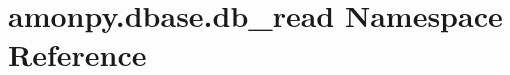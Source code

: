 \hypertarget{namespaceamonpy_1_1dbase_1_1db__read}{\section{amonpy.\-dbase.\-db\-\_\-read Namespace Reference}
\label{namespaceamonpy_1_1dbase_1_1db__read}
}
